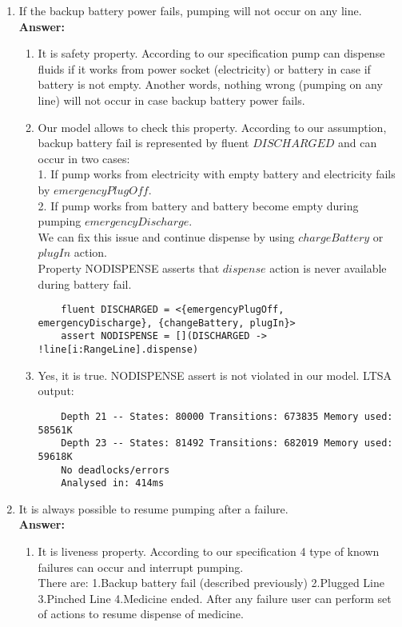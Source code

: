 \documentclass{article}
\begin{document}
\begin{enumerate}
    \item If the backup battery power fails, pumping will not occur on any line.\\
    \textbf{Answer:}
    \begin{enumerate}
    \item It is safety property. According to our specification pump can dispense fluids if it works from power
    socket (electricity) or battery in case if battery is not empty. Another words, nothing wrong (pumping on any line) will
    not occur in case backup battery power fails.
 
    \item Our model allows to check this property. According to our assumption, backup battery fail is represented by fluent
    $DISCHARGED$ and can occur in two cases:\\
    1. If pump works from electricity with empty battery and electricity fails by $emergencyPlugOff$. \\
    2. If pump works from battery and battery become empty during pumping $emergencyDischarge$. \\
    We can fix this issue and continue dispense by using $chargeBattery$ or $plugIn$ action.\\
    Property NODISPENSE asserts that $dispense$ action is never available during battery fail.
    \begin{verbatim}
    fluent DISCHARGED = <{emergencyPlugOff, emergencyDischarge}, {changeBattery, plugIn}>
    assert NODISPENSE = [](DISCHARGED -> !line[i:RangeLine].dispense)
    \end{verbatim}
    
    \item  Yes, it is true. NODISPENSE assert is not violated in our model. LTSA output:
    \begin{verbatim}
    Depth 21 -- States: 80000 Transitions: 673835 Memory used: 58561K
    Depth 23 -- States: 81492 Transitions: 682019 Memory used: 59618K
    No deadlocks/errors
    Analysed in: 414ms
    \end{verbatim} 
    \end{enumerate}    
    
    \item It is always possible to resume pumping after a failure.\\
    \textbf{Answer:}
    \begin{enumerate}
    \item It is liveness property. According to our specification 4 type of known failures can occur and interrupt
    pumping.\\
    There are: 1.Backup battery fail (described previously) 2.Plugged Line 3.Pinched Line 4.Medicine ended. After any
    failure user can perform set of actions to resume dispense of medicine. \\
 

\end{enumerate}
\end{enumerate}
\end{document}
